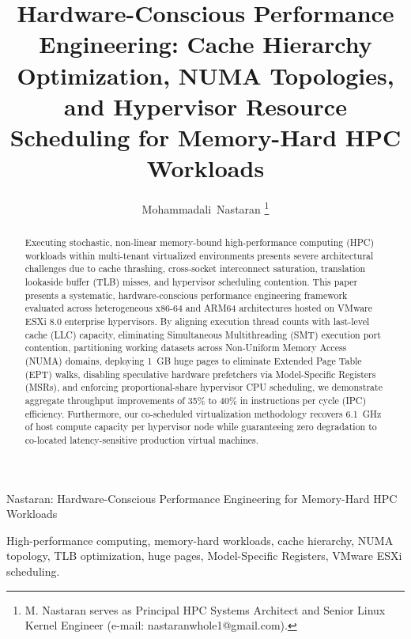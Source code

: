 \documentclass[journal]{IEEEtran}
\begin{document}
\title{Hardware-Conscious Performance Engineering: Cache Hierarchy Optimization, NUMA Topologies, and Hypervisor Resource Scheduling for Memory-Hard HPC Workloads}

\author{Mohammadali~Nastaran%
\thanks{M. Nastaran serves as Principal HPC Systems Architect and Senior Linux Kernel Engineer (e-mail: nastaranwhole1@gmail.com).}}

%
{Nastaran: Hardware-Conscious Performance Engineering for Memory-Hard HPC Workloads}

\maketitle

\begin{abstract}
Executing stochastic, non-linear memory-bound high-performance computing (HPC) workloads within multi-tenant virtualized environments presents severe architectural challenges due to cache thrashing, cross-socket interconnect saturation, translation lookaside buffer (TLB) misses, and hypervisor scheduling contention. This paper presents a systematic, hardware-conscious performance engineering framework evaluated across heterogeneous x86-64 and ARM64 architectures hosted on VMware ESXi 8.0 enterprise hypervisors. By aligning execution thread counts with last-level cache (LLC) capacity, eliminating Simultaneous Multithreading (SMT) execution port contention, partitioning working datasets across Non-Uniform Memory Access (NUMA) domains, deploying 1~GB huge pages to eliminate Extended Page Table (EPT) walks, disabling speculative hardware prefetchers via Model-Specific Registers (MSRs), and enforcing proportional-share hypervisor CPU scheduling, we demonstrate aggregate throughput improvements of 35\% to 40\% in instructions per cycle (IPC) efficiency. Furthermore, our co-scheduled virtualization methodology recovers 6.1~GHz of host compute capacity per hypervisor node while guaranteeing zero degradation to co-located latency-sensitive production virtual machines.
\end{abstract}

\begin{IEEEkeywords}
High-performance computing, memory-hard workloads, cache hierarchy, NUMA topology, TLB optimization, huge pages, Model-Specific Registers, VMware ESXi scheduling.
\end{IEEEkeywords}
\end{document}
